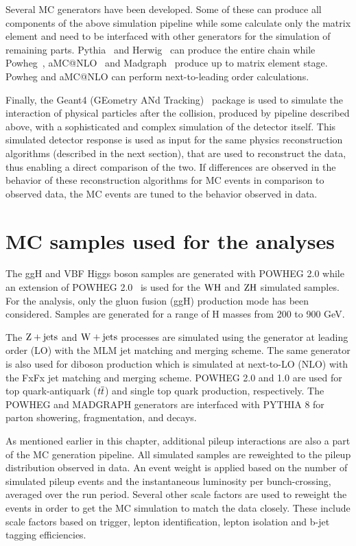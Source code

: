 Several MC generators have been developed. Some of these can produce all components of the above simulation pipeline while some calculate only the matrix element and need to be interfaced with other generators for the simulation of remaining parts. Pythia~\cite{Sjostrand:pythia8} and Herwig~\cite{herwig} can produce the entire chain while Powheg~\cite{Nason:2004rx,Frixione:2007vw, Alioli:2010xd, Alioli:2010xa, Alioli:2008tz, Bagnaschi:2011tu}, aMC@NLO~\cite{Alwall:2014} and Madgraph~\cite{Alwall:2011uj} produce up to matrix element stage. Powheg and aMC@NLO can perform next-to-leading order calculations. 

Finally, the Geant4 (GEometry ANd Tracking)~\cite{GEANT4} package is used to simulate the interaction of physical particles after the collision, produced by pipeline described  above, with a sophisticated and complex simulation of the detector itself. This simulated detector response is used as input for the same physics reconstruction algorithms (described in the next section), that are used to reconstruct the data, thus enabling a direct comparison of the two. If differences are observed in the behavior of these reconstruction algorithms for MC events in comparison to observed data, the MC events are tuned to the behavior observed in data. 


\section{MC samples used for the analyses}
\label{samples_mc}

The {ggH} and VBF Higgs boson samples are generated with POWHEG 2.0 while an extension of POWHEG 2.0~\cite{Luisoni:2013kna} is used for the $\text{W}\text{H}$ and $\text{Z}\text{H}$ simulated samples. For the \Hmue analysis, only the gluon fusion (ggH) production mode has been considered. Samples are generated for a range of H masses from 200 to 900 GeV.

The $\text{Z}+\text{jets}$ and $\text{W}+\text{jets}$ processes are simulated using the \aMCATNLO generator at leading order (LO) with the MLM jet matching and merging scheme. The same generator is also used for diboson production which is simulated at  next-to-LO (NLO) with the FxFx jet matching and merging scheme. POWHEG 2.0 and 1.0 are used for top quark-antiquark ($t\overline{t}$) and single top quark production, respectively. The POWHEG and MADGRAPH generators are interfaced with PYTHIA 8 for parton showering, fragmentation, and decays. 

As mentioned earlier in this chapter, additional pileup interactions are also a part of the MC generation pipeline. All simulated samples are reweighted to the pileup distribution observed in data. An event weight is applied based on the number of simulated pileup events and the instantaneous luminosity per bunch-crossing, averaged over the run period. Several other scale factors  are used to reweight the events in order to get the MC simulation to match the data closely. These include scale factors based on trigger, lepton identification, lepton isolation and b-jet tagging efficiencies.

